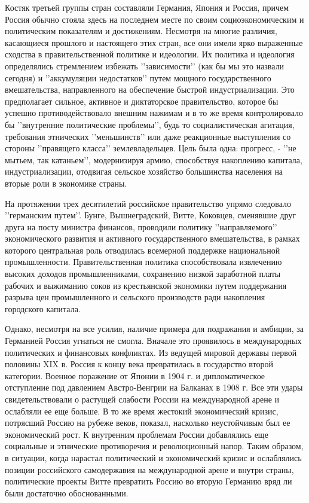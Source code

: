 \documentclass[12pt]{article}
\begin{document}
Костяк третьей группы стран составляли Германия, Япония и Россия, причем Россия обычно стояла здесь на последнем месте по своим социоэкономическим и политическим показателям и достижениям. Несмотря на многие различия, касающиеся прошлого и настоящего этих стран, все они имели ярко выраженные сходства в правительственной политике и идеологии. Их политика и идеология определялись стремлением избежать \rq\rq{}зависимости\rq\rq{} (как бы мы это назвали сегодня) и \rq\rq{}аккумуляции недостатков\rq\rq{} путем мощного государственного вмешательства, направленного на обеспечение быстрой индустриализации. Это предполагает сильное, активное и диктаторское правительство, которое бы успешно противодействовало внешним нажимам и в то же время контролировало бы \rq\rq{}внутренние политические проблемы\rq\rq{}, будь то социалистическая агитация, требования этнических \rq\rq{}меньшинств\rq\rq{} или даже реакционные выступления со стороны \rq\rq{}правящего класса\rq\rq{} землевладельцев. Цель была одна: прогресс, - \rq\rq{}не мытьем, так катаньем\rq\rq{}, модернизируя армию, способствуя накоплению капитала, индустриализации, отодвигая сельское хозяйство большинства населения на вторые роли в экономике страны.

На протяжении трех десятилетий российское правительство упрямо следовало \rq\rq{}германским путем\rq\rq{}. Бунге, Вышнеградский, Витте, Коковцев, сменявшие друг друга на посту министра финансов, проводили политику \rq\rq{}направляемого\rq\rq{} экономического развития и активного государственного вмешательства, в рамках которого центральная роль отводилась всемерной поддержке национальной промышленности. Правительственная политика способствовала извлечению высоких доходов промышленниками, сохранению низкой заработной платы рабочих и выжиманию соков из крестьянской экономики путем поддержания разрыва цен промышленного и сельского производств ради накопления городского капитала.

Однако, несмотря на все усилия, наличие примера для подражания и амбиции, за Германией Россия угнаться не смогла. Вначале это проявилось в международных политических и финансовых конфликтах. Из ведущей мировой державы первой половины XIX в. Россия к концу века превратилась в государство второй категории. Военное поражение от Японии в 1904 г. и дипломатическое отступление под давлением Австро-Венгрии на Балканах в 1908 г. Все эти удары свидетельствовали о растущей слабости России на международной арене и ослабляли ее еще больше. В то же время жестокий экономический кризис, потрясший Россию на рубеже веков, показал, насколько неустойчивым был ее экономический рост. К внутренним проблемам России добавлялись еще социальные и этнические противоречия и революционный напор. Таким образом, в ситуации, когда нарастал политический и экономический кризис и ослаблялись позиции российского самодержавия на международной арене и внутри страны, политические проекты Витте превратить Россию во вторую Германию вряд ли были достаточно обоснованными.
\end{document}
